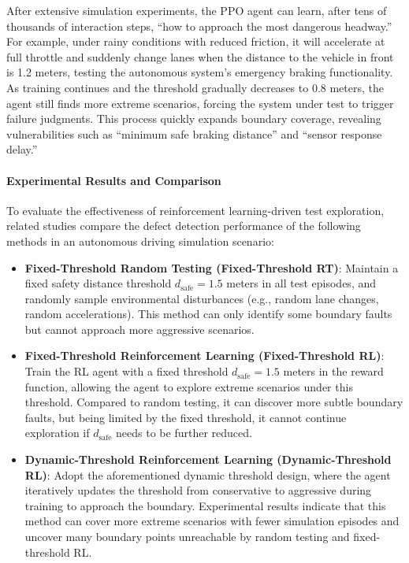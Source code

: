 \documentclass[manuscript,screen,review]{acmart}
\begin{document}
After extensive simulation experiments, the PPO agent can learn, after tens of thousands of interaction steps, ``how to approach the most dangerous headway.'' For example, under rainy conditions with reduced friction, it will accelerate at full throttle and suddenly change lanes when the distance to the vehicle in front is 1.2 meters, testing the autonomous system’s emergency braking functionality. As training continues and the threshold gradually decreases to 0.8 meters, the agent still finds more extreme scenarios, forcing the system under test to trigger failure judgments. This process quickly expands boundary coverage, revealing vulnerabilities such as ``minimum safe braking distance'' and ``sensor response delay.''

\paragraph{Experimental Results and Comparison}  
To evaluate the effectiveness of reinforcement learning-driven test exploration, related studies compare the defect detection performance of the following methods in an autonomous driving simulation scenario:
\begin{itemize}
  \item \textbf{Fixed-Threshold Random Testing (Fixed-Threshold RT)}: Maintain a fixed safety distance threshold $d_{\mathrm{safe}} = 1.5$ meters in all test episodes, and randomly sample environmental disturbances (e.g., random lane changes, random accelerations). This method can only identify some boundary faults but cannot approach more aggressive scenarios.
  \item \textbf{Fixed-Threshold Reinforcement Learning (Fixed-Threshold RL)}: Train the RL agent with a fixed threshold $d_{\mathrm{safe}} = 1.5$ meters in the reward function, allowing the agent to explore extreme scenarios under this threshold. Compared to random testing, it can discover more subtle boundary faults, but being limited by the fixed threshold, it cannot continue exploration if $d_{\mathrm{safe}}$ needs to be further reduced.
  \item \textbf{Dynamic-Threshold Reinforcement Learning (Dynamic-Threshold RL)}: Adopt the aforementioned dynamic threshold design, where the agent iteratively updates the threshold from conservative to aggressive during training to approach the boundary. Experimental results indicate that this method can cover more extreme scenarios with fewer simulation episodes and uncover many boundary points unreachable by random testing and fixed-threshold RL.
\end{itemize}
\end{document}
